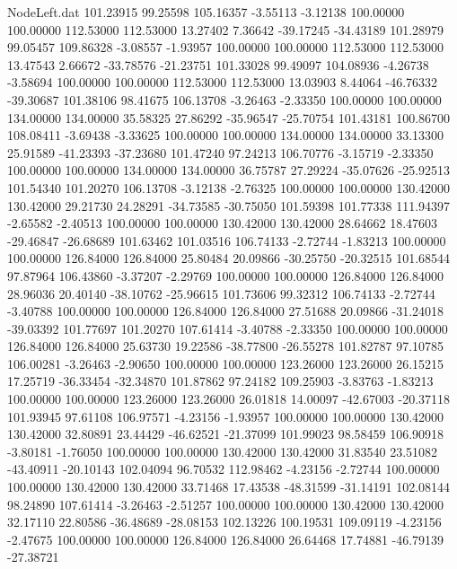 \begin{filecontents}{NodeLeft.dat}
 101.23915   99.25598  105.16357    -3.55113   -3.12138  100.00000  100.00000  112.53000  112.53000   13.27402    7.36642  -39.17245  -34.43189
 101.28979   99.05457  109.86328    -3.08557   -1.93957  100.00000  100.00000  112.53000  112.53000   13.47543    2.66672  -33.78576  -21.23751
 101.33028   99.49097  104.08936    -4.26738   -3.58694  100.00000  100.00000  112.53000  112.53000   13.03903    8.44064  -46.76332  -39.30687
 101.38106   98.41675  106.13708    -3.26463   -2.33350  100.00000  100.00000  134.00000  134.00000   35.58325   27.86292  -35.96547  -25.70754
 101.43181  100.86700  108.08411    -3.69438   -3.33625  100.00000  100.00000  134.00000  134.00000   33.13300   25.91589  -41.23393  -37.23680
 101.47240   97.24213  106.70776    -3.15719   -2.33350  100.00000  100.00000  134.00000  134.00000   36.75787   27.29224  -35.07626  -25.92513
 101.54340  101.20270  106.13708    -3.12138   -2.76325  100.00000  100.00000  130.42000  130.42000   29.21730   24.28291  -34.73585  -30.75050
 101.59398  101.77338  111.94397    -2.65582   -2.40513  100.00000  100.00000  130.42000  130.42000   28.64662   18.47603  -29.46847  -26.68689
 101.63462  101.03516  106.74133    -2.72744   -1.83213  100.00000  100.00000  126.84000  126.84000   25.80484   20.09866  -30.25750  -20.32515
 101.68544   97.87964  106.43860    -3.37207   -2.29769  100.00000  100.00000  126.84000  126.84000   28.96036   20.40140  -38.10762  -25.96615
 101.73606   99.32312  106.74133    -2.72744   -3.40788  100.00000  100.00000  126.84000  126.84000   27.51688   20.09866  -31.24018  -39.03392
 101.77697  101.20270  107.61414    -3.40788   -2.33350  100.00000  100.00000  126.84000  126.84000   25.63730   19.22586  -38.77800  -26.55278
 101.82787   97.10785  106.00281    -3.26463   -2.90650  100.00000  100.00000  123.26000  123.26000   26.15215   17.25719  -36.33454  -32.34870
 101.87862   97.24182  109.25903    -3.83763   -1.83213  100.00000  100.00000  123.26000  123.26000   26.01818   14.00097  -42.67003  -20.37118
 101.93945   97.61108  106.97571    -4.23156   -1.93957  100.00000  100.00000  130.42000  130.42000   32.80891   23.44429  -46.62521  -21.37099
 101.99023   98.58459  106.90918    -3.80181   -1.76050  100.00000  100.00000  130.42000  130.42000   31.83540   23.51082  -43.40911  -20.10143
 102.04094   96.70532  112.98462    -4.23156   -2.72744  100.00000  100.00000  130.42000  130.42000   33.71468   17.43538  -48.31599  -31.14191
 102.08144   98.24890  107.61414    -3.26463   -2.51257  100.00000  100.00000  130.42000  130.42000   32.17110   22.80586  -36.48689  -28.08153
 102.13226  100.19531  109.09119    -4.23156   -2.47675  100.00000  100.00000  126.84000  126.84000   26.64468   17.74881  -46.79139  -27.38721

\end{filecontents}
